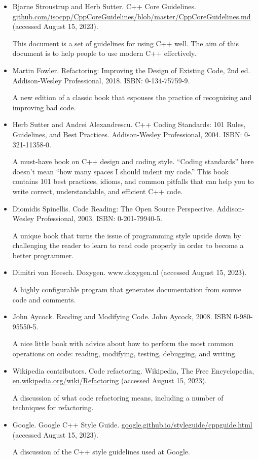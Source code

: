 
\begin{itemize}
\item
Bjarne Stroustrup and Herb Sutter. C++ Core Guidelines. \url{github.com/isocpp/CppCoreGuidelines/blob/master/CppCoreGuidelines.md} (accessed August 15, 2023).

This document is a set of guidelines for using C++ well. The aim of this document is to help people to use modern C++ effectively.

\item
Martin Fowler. Refactoring: Improving the Design of Existing Code, 2nd ed. Addison-Wesley Professional, 2018. ISBN: 0-134-75759-9.

A new edition of a classic book that espouses the practice of recognizing and improving bad code.

\item
Herb Sutter and Andrei Alexandrescu. C++ Coding Standards: 101 Rules, Guidelines, and Best Practices. Addison-Wesley Professional, 2004. ISBN: 0-321-11358-0.

A must-have book on C++ design and coding style. “Coding standards” here doesn’t mean “how many spaces I should indent my code.” This book contains 101 best practices, idioms, and common pitfalls that can help you to write correct, understandable, and efficient C++ code.

\item
Diomidis Spinellis. Code Reading: The Open Source Perspective. Addison-Wesley Professional, 2003. ISBN: 0-201-79940-5.

A unique book that turns the issue of programming style upside down by challenging the reader to learn to read code properly in order to become a better programmer.

\item
Dimitri van Heesch. Doxygen. www.doxygen.nl (accessed August 15, 2023).

A highly configurable program that generates documentation from source code and comments.

\item
John Aycock. Reading and Modifying Code. John Aycock, 2008. ISBN 0-980-95550-5.

A nice little book with advice about how to perform the most common operations on code: reading, modifying, testing, debugging, and writing.

\item
Wikipedia contributors. Code refactoring. Wikipedia, The Free Encyclopedia, \url{en.wikipedia.org/wiki/Refactoring} (accessed August 15, 2023).

A discussion of what code refactoring means, including a number of techniques for refactoring.

\item
Google. Google C++ Style Guide. \url{google.github.io/styleguide/cppguide.html} (accessed August 15, 2023).

A discussion of the C++ style guidelines used at Google.
\end{itemize}


